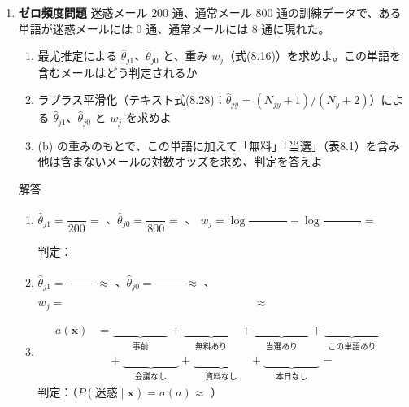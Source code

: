\documentclass[a4paper,dvipdfmx]{jsarticle}
\newcommand{\提出期限}{2026年11月16日（月）}
\newcommand{\学籍番号}{0000000}
\newcommand{\氏名}{氏名を書く}
\newcommand{\提出日}{2026年11月16日}
\newenvironment{answer}{\begin{itembox}[l]{解答}}{\end{itembox}}
\begin{document}
\begin{enumerate}
\begin{answer}
\begin{enumerate}
          $N_3 = 0$ のとき、最尤推定は \phantom{XXXXXXXXXXXXXXXX}、ラプラス平滑化は \phantom{XXXXXXXXXXXXXXXX}
          \vspace{6mm}
      \end{enumerate}
    \end{answer}

  \item \textbf{ゼロ頻度問題}\quad
    迷惑メール $200$ 通、通常メール $800$ 通の訓練データで、ある単語が迷惑メールには $0$ 通、通常メールには $8$ 通に現れた。
    \begin{enumerate}
      \item 最尤推定による $\hat{\theta}_{j1}$、$\hat{\theta}_{j0}$ と、重み $w_j$（式(8.16)）を求めよ。この単語を含むメールはどう判定されるか
      \item ラプラス平滑化（テキスト式(8.28)：$\hat{\theta}_{jy} = (N_{jy} + 1)/(N_y + 2)$）による $\hat{\theta}_{j1}$、$\hat{\theta}_{j0}$ と $w_j$ を求めよ
      \item (b) の重みのもとで、この単語に加えて「無料」「当選」（表8.1）を含み他は含まないメールの対数オッズを求め、判定を答えよ
    \end{enumerate}
    \begin{answer}
      \begin{enumerate}
        \item $\hat{\theta}_{j1} = \dfrac{\phantom{XX}}{200} = $ \phantom{XXXX}、$\hat{\theta}_{j0} = \dfrac{\phantom{XX}}{800} = $ \phantom{XXXX}、
          $w_j = \log\dfrac{\phantom{XXXX}}{\phantom{XXXX}} - \log\dfrac{\phantom{XXXX}}{\phantom{XXXX}} = $ \phantom{XXXXXX}
          \vspace{2mm}

          判定：
          \vspace{8mm}
        \item $\hat{\theta}_{j1} = \dfrac{\phantom{XX}}{\phantom{XXX}} \approx$ \phantom{XXXXXX}、$\hat{\theta}_{j0} = \dfrac{\phantom{XX}}{\phantom{XXX}} \approx$ \phantom{XXXXXX}、
          $w_j = \phantom{XXXXXXXXXXXXXXXXXXXX} \approx$ \phantom{XXXXXX}
          \vspace{4mm}
        \item
          \begin{align*}
            a(\bm{x}) &= \underbrace{\phantom{XXXXXX}}_{\text{事前}} + \underbrace{\phantom{XXXXXX}}_{\text{無料あり}} + \underbrace{\phantom{XXXXXX}}_{\text{当選あり}} + \underbrace{\phantom{XXXXXX}}_{\text{この単語あり}} \\
            &\quad + \underbrace{\phantom{XXXXXX}}_{\text{会議なし}} + \underbrace{\phantom{XXXXXX}}_{\text{資料なし}} + \underbrace{\phantom{XXXXXX}}_{\text{本日なし}} = \phantom{XXXXXX}
          \end{align*}
          判定：\phantom{XXXXXX}（$P(\text{迷惑} \mid \bm{x}) = \sigma(a) \approx$ \phantom{XXXX}）
          \vspace{2mm}
      \end{enumerate}
    \end{answer}


\end{enumerate}
\end{document}

